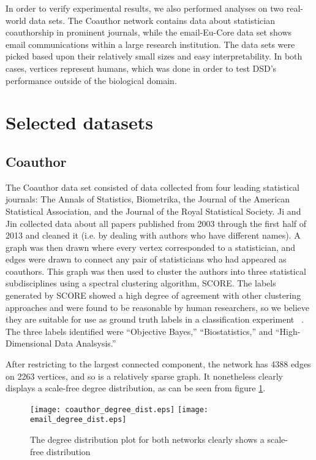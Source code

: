 In order to verify experimental results, we also performed analyses on two real-world data sets. The
Coauthor network contains data about statistician coauthorship in prominent journals, while the
email-Eu-Core data set shows email communications within a large research institution. The data sets
were picked based upon their relatively small sizes and easy interpretability. In both cases,
vertices represent humans, which was done in order to test DSD's performance outside of the
biological domain.


\section{Selected datasets}

\subsection{Coauthor}

The Coauthor data set consisted of data collected from four leading statistical journals: The Annals
of Statistics, Biometrika, the Journal of the American Statistical Association, and the Journal of
the Royal Statistical Society. Ji and Jin collected data about all papers published from 2003
through the first half of 2013 and cleaned it (i.e. by dealing with authors who have different
names). A graph was then drawn where every vertex corresponded to a statistician, and edges were
drawn to connect any pair of statisticians who had appeared as coauthors. This graph was then used
to cluster the authors into three statistical subdisciplines using a spectral clustering algorithm,
SCORE. The labels generated by SCORE showed a high degree of agreement with other clustering
approaches and were found to be reasonable by human researchers, so we believe they are suitable for
use as ground truth labels in a classification experiment ~\cite{ji2016}. The three labels
identified were ``Objective Bayes,'' ``Biostatistics,'' and ``High-Dimensional Data Analsysis.''

After restricting to the largest connected component, the network has 4388 edges on 2263 vertices,
and so is a relatively sparse graph. It nonetheless clearly displays a scale-free degree
distribution, as can be seen from figure \ref{fig:real_world_degree_dist}.

\begin{figure}
  \centering
  \texttt{[image: coauthor\_degree\_dist.eps]}
  \texttt{[image: email\_degree\_dist.eps]}
  \caption{The degree distribution plot for both networks clearly shows a scale-free distribution}
  \label{fig:real_world_degree_dist}
\end{figure}


